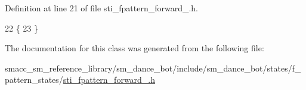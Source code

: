 Definition at line 21 of file sti\+\_\+fpattern\+\_\+forward\+\_.\+h.


\begin{DoxyCode}
22   \{
23   \}
\end{DoxyCode}


The documentation for this class was generated from the following file\+:\begin{DoxyCompactItemize}
\item 
smacc\+\_\+sm\+\_\+reference\+\_\+library/sm\+\_\+dance\+\_\+bot/include/sm\+\_\+dance\+\_\+bot/states/f\+\_\+pattern\+\_\+states/\hyperlink{include_2sm__dance__bot_2states_2f__pattern__states_2sti__fpattern__forward__2_8h}{sti\+\_\+fpattern\+\_\+forward\+\_.\+h}\end{DoxyCompactItemize}
